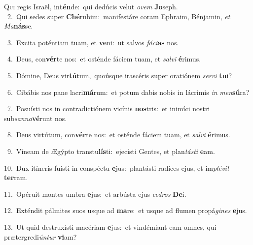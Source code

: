 \lettrine{\initial\textcolor{\initialcolor}{Q}}{ui} regis Israël, in\-\textbf{tén}\-de:~\star qui dedúcis velut \textit{o}\-\textit{vem} \textbf{Jo}\-seph.\\
{\numbfont\textcolor{\numbcolor}{~2.}}~Qui sedes super \textbf{Ché}\-rubim:~\star manifestáre coram Ephraim, Bénjamin, \textit{et} \textit{Ma}\-\textbf{nás}se.\par
{\numbfont\textcolor{\numbcolor}{~3.}}~Excita poténtiam tuam, et \textbf{ve}\-ni:~\star ut salvos \textit{fá}\-\textit{ci}\textbf{as} nos.\par
{\numbfont\textcolor{\numbcolor}{~4.}}~Deus, con\-\textbf{vér}\-te nos:~\star et osténde fáciem tuam, et \textit{sal}\-\textit{vi} \textbf{é}\-rimus.\par
{\numbfont\textcolor{\numbcolor}{~5.}}~Dómine, Deus vir\-\textbf{tú}\-tum,~\star quoúsque irascéris super oratiónem \textit{ser}\-\textit{vi} \textbf{tu}\-i?\par
{\numbfont\textcolor{\numbcolor}{~6.}}~Cibábis nos pane lacri\-\textbf{má}\-rum:~\star et potum dabis nobis in lácrimis \textit{in} \textit{men}\-\textbf{sú}ra?\par
{\numbfont\textcolor{\numbcolor}{~7.}}~Posuísti nos in contradictiónem vicínis \textbf{nos}\-tris:~\star et inimíci nostri sub\-\textit{san}\-\textit{na}\textbf{vé}runt nos.\par
{\numbfont\textcolor{\numbcolor}{~8.}}~Deus virtútum, con\-\textbf{vér}\-te nos:~\star et osténde fáciem tuam, et \textit{sal}\-\textit{vi} \textbf{é}\-rimus.\par
{\numbfont\textcolor{\numbcolor}{~9.}}~Víneam de Ægýpto transtu\-\textbf{lís}\-ti:~\star ejecísti Gentes, et plan\-\textit{tás}\-\textit{ti} \textbf{e}\-am.\par
{\numbfont\textcolor{\numbcolor}{10.}}~Dux itíneris fuísti in conspéctu \textbf{e}\-jus:~\star plantásti radíces ejus, et im\-\textit{plé}\-\textit{vit} \textbf{ter}\-ram.\par
{\numbfont\textcolor{\numbcolor}{11.}}~Opéruit montes umbra \textbf{e}\-jus:~\star et arbústa ejus \textit{ce}\-\textit{dros} \textbf{De}\-i.\par
{\numbfont\textcolor{\numbcolor}{12.}}~Exténdit pálmites suos usque ad \textbf{ma}\-re:~\star et usque ad flumen propá\-\textit{gi}\-\textit{nes} \textbf{e}\-jus.\par
{\numbfont\textcolor{\numbcolor}{13.}}~Ut quid destruxísti macériam \textbf{e}\-jus:~\star et vindémiant eam omnes, qui prætergredi\-\textit{ún}\-\textit{tur} \textbf{vi}\-am?\par
